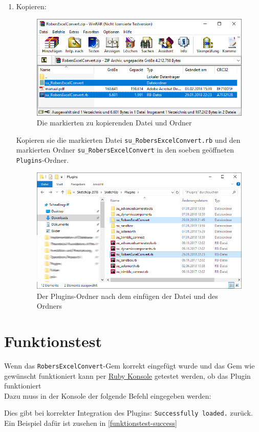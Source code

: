 \documentclass{book}
\newcommand{\robersexcelconvert}{\texttt{RobersExcelConvert}\xspace}
\begin{document}
\begin{enumerate}
						Innerhalb von diesem Ordner öffnen Sie die folgende Ordnerstruktur: 
						
						Dies ist der Ordner in welchen nun mit dem folgenden Schritt das \robersexcelconvert-Gem eingefügt werden sollte.
					\item Kopieren:
						\begin{figure}[H]
							\centering
							\includegraphics[scale=0.6]{pics/plugins-ordner/zip-datei.png}
							\caption{Die markierten zu kopierenden Datei und Ordner}
						\end{figure}
						Kopieren sie die markierten Datei \texttt{su\_RobersExcelConvert.rb} und den markierten Ordner \texttt{su\_RobersExcelConvert} in den soeben geöffneten \texttt{Plugins}-Ordner.
						\begin{figure}[H]
							\centering
							\includegraphics[scale=0.6]{pics/plugins-ordner/plugins-ordner.png}
							\caption{Der Plugins-Ordner nach dem einfügen der Datei und des Ordners}
						\end{figure}
				\end{enumerate}
		\section{Funktionstest}\label{Funktionstest}
			Wenn das \robersexcelconvert-Gem korrekt eingefügt wurde und das Gem wie gewünscht funktioniert kann per \hyperref[Ruby Konsole]{Ruby Konsole} getestet werden, ob das Plugin funktioniert\\
			Dazu muss in der Konsole der folgende Befehl eingegeben werden:
			
			Dies gibt bei korrekter Integration des Plugins: \texttt{Successfully loaded.} zurück. Ein Beispiel dafür ist zusehen in \ref{funktionstest-success}\\
			
\end{document}

